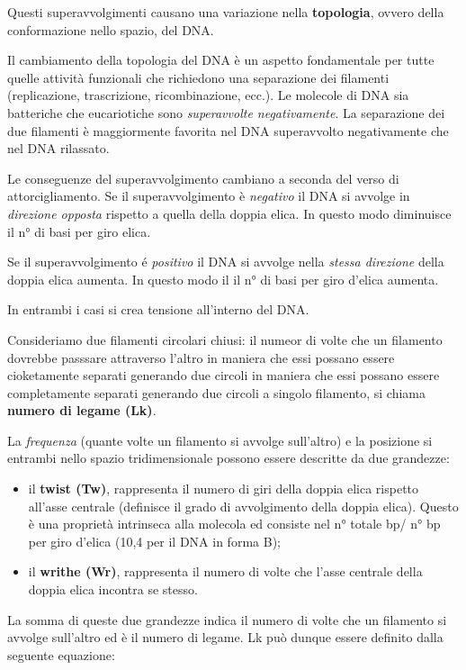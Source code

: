 \documentclass[11pt]{book}
\begin{document}
Questi superavvolgimenti causano una variazione nella
\textbf{topologia}, ovvero della conformazione nello spazio, del DNA.

Il cambiamento della topologia del DNA è un aspetto fondamentale per
tutte quelle attività funzionali che richiedono una separazione dei
filamenti (replicazione, trascrizione, ricombinazione, ecc.). Le
molecole di DNA sia batteriche che eucariotiche sono \emph{superavvolte
negativamente}. La separazione dei due filamenti è maggiormente favorita
nel DNA superavvolto negativamente che nel DNA rilassato.

Le conseguenze del superavvolgimento cambiano a seconda del verso di
attorcigliamento. Se il superavvolgimento è \emph{negativo} il DNA si
avvolge in \emph{direzione opposta} rispetto a quella della doppia
elica. In questo modo diminuisce il n° di basi per giro elica.

Se il superavvolgimento é \emph{positivo} il DNA si avvolge nella
\emph{stessa direzione} della doppia elica aumenta. In questo modo il il
n° di basi per giro d'elica aumenta.

In entrambi i casi si crea tensione all'interno del DNA.

Consideriamo due filamenti circolari chiusi: il numeor di volte che un
filamento dovrebbe passsare attraverso l'altro in maniera che essi
possano essere cioketamente separati generando due circoli in maniera
che essi possano essere completamente separati generando due circoli a
singolo filamento, si chiama \textbf{numero di legame (Lk)}.

La \emph{frequenza} (quante volte un filamento si avvolge sull'altro) e
la posizione si entrambi nello spazio tridimensionale possono essere
descritte da due grandezze:

\begin{itemize}
\itemsep1pt\parskip0pt
\item
  il \textbf{twist (Tw)}, rappresenta il numero di giri della doppia
  elica rispetto all'asse centrale (definisce il grado di avvolgimento
  della doppia elica). Questo è una proprietà intrinseca alla molecola
  ed consiste nel n° totale bp/ n° bp per giro d'elica (10,4 per il DNA
  in forma B);
\item
  il \textbf{writhe (Wr)}, rappresenta il numero di volte che l'asse
  centrale della doppia elica incontra se stesso.
\end{itemize}

La somma di queste due grandezze indica il numero di volte che un
filamento si avvolge sull'altro ed è il numero di legame. Lk può dunque
essere definito dalla seguente equazione:
\end{document}

